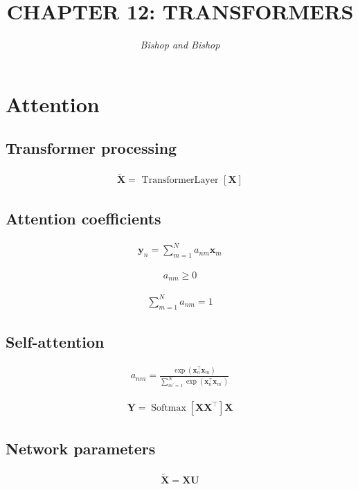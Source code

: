 \documentclass{article}
\title{\LARGE\scshape\MakeUppercase{Chapter 12: Transformers}}
\author{\textit{Bishop and Bishop}}
\date{}
\begin{document}
\maketitle

\section{Attention}

\subsection{Transformer processing}
\begin{align*}
\widetilde{\mathbf{X}}=\text{ TransformerLayer }[
\mathbf{X}]
\tag{12.1}
\end{align*}

\subsection{Attention coefficients}
\begin{align*}
\mathbf{y}_{n}=\sum_{m=1}^{N} a_{n m} \mathbf{x}_{m} \tag{12.2}
\end{align*}

\begin{align*}
a_{n m} \geqslant 0  \tag{12.3}
\end{align*}

\begin{align*}
\sum_{m=1}^{N} a_{n m}=1 \tag{12.4}
\end{align*}

\subsection{Self-attention}
\begin{align*}
a_{n m}=\frac{\exp \left(\mathbf{x}_{n}^{\top} \mathbf{x}_{m}\right)}{\sum_{m^{\prime}=1}^{N} \exp \left(\mathbf{x}_{n}^{\top} \mathbf{x}_{m^{\prime}}\right)} \tag{12.5}
\end{align*}

\begin{align*}
\mathbf{Y}=\operatorname{Softmax}\left[
\mathbf{X} \mathbf{X}^{\top}\right]
\mathbf{X} \tag{12.6}
\end{align*}

\subsection{Network parameters}
\begin{align*}
\tilde{\mathbf{X}}=\mathbf{XU} \tag{12.7}
\end{align*}
\end{document}
